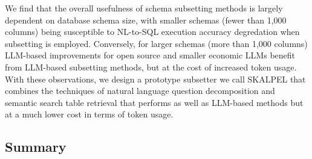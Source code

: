 We find that the overall usefulness of schema subsetting methods is largely dependent on database schema size, with smaller schemas (fewer than 1,000 columns) being susceptible to NL-to-SQL execution accuracy degredation when subsetting is employed.
Conversely, for larger schemas (more than 1,000 columns) LLM-based improvements for open source and smaller economic LLMs benefit from LLM-based subsetting methods, but at the cost of increased token usage.
With these observations, we design a prototype subsetter we call SKALPEL that combines the techniques of natural language question decomposition and semantic search table retrieval that performs as well as LLM-based methods but at a much lower cost in terms of token usage.

\subsection{Summary}